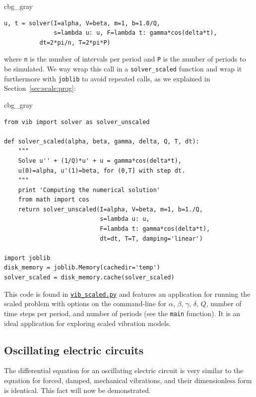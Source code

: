 \documentclass[graybox,envcountchap,sectrefs,final]{svmonodo}
\newenvironment{_cod_tight}[1]{
   \def\FrameCommand{\colorbox{#1}}
   \FrameRule0.6pt\MakeFramed {\FrameRestore}\vskip3mm}
   {\vskip0mm\endMakeFramed}
\newenvironment{cod}[1]{
\bgroup\rmfamily
\fboxsep=0mm\relax
\begin{_cod_tight}{#1}
\list{}{\parsep=-2mm\parskip=0mm\topsep=0pt\leftmargin=2mm
\rightmargin=2\leftmargin\leftmargin=4pt\relax}
\item\relax}
{\endlist\end{_cod_tight}\egroup}
\begin{document}
\begin{cod}{cbg_gray}\begin{Verbatim}[numbers=none,fontsize=\fontsize{9pt}{9pt},baselinestretch=0.95,xleftmargin=2mm]
u, t = solver(I=alpha, V=beta, m=1, b=1.0/Q,
              s=lambda u: u, F=lambda t: gamma*cos(delta*t),
	      dt=2*pi/n, T=2*pi*P)
\end{Verbatim}
\end{cod}
\noindent
where \texttt{n} is the number of intervals per period and \texttt{P} is the number
of periods to be simulated.
We way wrap this call in a \Verb!solver_scaled! function and wrap it furthermore
with \texttt{joblib} to avoid repeated calls,
as we explained in
Section~\ref{sec:scale:prog}:

\begin{cod}{cbg_gray}\begin{Verbatim}[numbers=none,fontsize=\fontsize{9pt}{9pt},baselinestretch=0.95,xleftmargin=2mm]
from vib import solver as solver_unscaled

def solver_scaled(alpha, beta, gamma, delta, Q, T, dt):
    """
    Solve u'' + (1/Q)*u' + u = gamma*cos(delta*t),
    u(0)=alpha, u'(1)=beta, for (0,T] with step dt.
    """
    print 'Computing the numerical solution'
    from math import cos
    return solver_unscaled(I=alpha, V=beta, m=1, b=1./Q,
                           s=lambda u: u,
                           F=lambda t: gamma*cos(delta*t),
                           dt=dt, T=T, damping='linear')

import joblib
disk_memory = joblib.Memory(cachedir='temp')
solver_scaled = disk_memory.cache(solver_scaled)
\end{Verbatim}
\end{cod}
\noindent
This code is found in \href{{http://tinyurl.com/o8pb3yy/vib_scaled.py}}{\nolinkurl{vib_scaled.py}}
and features an application for running the scaled problem with
options on the command-line for $\alpha$, $\beta$, $\gamma$, $\delta$,
$Q$, number of time steps per period, and number of periods (see
the \texttt{main} function). It is an ideal application for exploring
scaled vibration models.


\subsection{Oscillating electric circuits}

The differential equation for an oscillating electric circuit is
very similar to the equation for forced, damped,
mechanical vibrations, and their
dimensionless form is identical. This fact will now be demonstrated.
\end{document}
